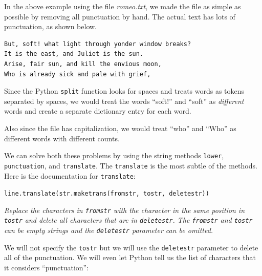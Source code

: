 \documentclass[10pt,]{book}
\newenvironment{Shaded}{}{}
\newcommand{\CharTok}[1]{\textcolor[rgb]{0.25,0.44,0.63}{#1}}
\newcommand{\CommentTok}[1]{\textcolor[rgb]{0.38,0.63,0.69}{\textit{#1}}}
\newcommand{\ImportTok}[1]{\textcolor[rgb]{0.00,0.50,0.00}{\textbf{#1}}}
\newcommand{\NormalTok}[1]{#1}
\newcommand{\OperatorTok}[1]{\textcolor[rgb]{0.40,0.40,0.40}{#1}}
\begin{document}

In the above example using the file \emph{romeo.txt}, we made the file
as simple as possible by removing all punctuation by hand. The actual
text has lots of punctuation, as shown below.

{\small
\begin{verbatim}
But, soft! what light through yonder window breaks?
It is the east, and Juliet is the sun.
Arise, fair sun, and kill the envious moon,
Who is already sick and pale with grief,
\end{verbatim}
}

Since the Python \texttt{split} function looks for spaces and treats
words as tokens separated by spaces, we would treat the words ``soft!''
and ``soft'' as \emph{different} words and create a separate dictionary
entry for each word.

Also since the file has capitalization, we would treat ``who'' and
``Who'' as different words with different counts.

We can solve both these problems by using the string methods
\texttt{lower}, \texttt{punctuation}, and \texttt{translate}. The
\texttt{translate} is the most subtle of the methods. Here is the
documentation for \texttt{translate}:

\texttt{line.translate(str.maketrans(fromstr,\ tostr,\ deletestr))}

\emph{Replace the characters in \texttt{fromstr} with the character in
the same position in \texttt{tostr} and delete all characters that are
in \texttt{deletestr}. The \texttt{fromstr} and \texttt{tostr} can be
empty strings and the \texttt{deletestr} parameter can be omitted.}

We will not specify the \texttt{tostr} but we will use the
\texttt{deletestr} parameter to delete all of the punctuation. We will
even let Python tell us the list of characters that it considers
``punctuation'':

\begin{Shaded}
\end{Shaded}
\end{document}
